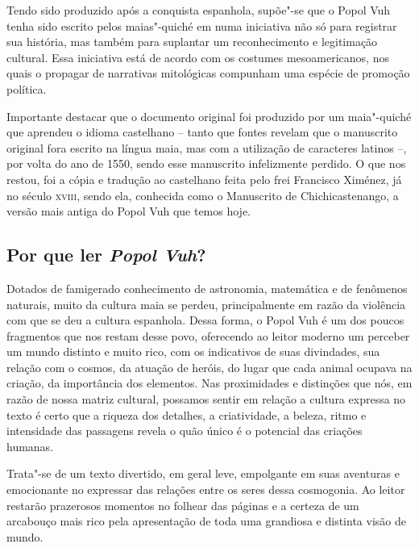 \documentclass[12pt]{extarticle}
\begin{document}


Tendo sido produzido após a conquista espanhola, supõe"-se que o Popol
Vuh tenha sido escrito pelos maias"-quiché em numa iniciativa não só para
registrar sua história, mas também para suplantar um reconhecimento e
legitimação cultural. Essa iniciativa está de acordo com os costumes
mesoamericanos, nos quais o propagar de narrativas mitológicas compunham
uma espécie de promoção política.

Importante destacar que o documento original foi produzido por um
maia"-quiché que aprendeu o idioma castelhano -- tanto que fontes revelam
que o manuscrito original fora escrito na língua maia, mas com a
utilização de caracteres latinos --, por volta do ano de 1550, sendo
esse manuscrito infelizmente perdido. O que nos restou, foi a cópia e
tradução ao castelhano feita pelo frei Francisco Ximénez, já no século
\textsc{xviii}, sendo ela, conhecida como o Manuscrito de Chichicastenango, a
versão mais antiga do Popol Vuh que temos hoje.


 
 
\subsection{Por que ler \textit{Popol Vuh}?}

Dotados de famigerado conhecimento de astronomia, matemática e de
fenômenos naturais, muito da cultura maia se perdeu, principalmente em
razão da violência com que se deu a cultura espanhola. Dessa forma, o
Popol Vuh é um dos poucos fragmentos que nos restam desse povo,
oferecendo ao leitor moderno um perceber um mundo distinto e muito rico,
com os indicativos de suas divindades, sua relação com o cosmos, da
atuação de heróis, do lugar que cada animal ocupava na criação, da
importância dos elementos. Nas proximidades e distinções que nós, em
razão de nossa matriz cultural, possamos sentir em relação a cultura
expressa no texto é certo que a riqueza dos detalhes, a criatividade, a
beleza, ritmo e intensidade das passagens revela o quão único é o
potencial das criações humanas.

Trata"-se de um texto divertido, em geral leve, empolgante em suas
aventuras e emocionante no expressar das relações entre os seres dessa
cosmogonia. Ao leitor restarão prazerosos momentos no folhear das páginas
e a certeza de um arcabouço mais rico pela apresentação de toda uma
grandiosa e distinta visão de mundo.
\end{document}
